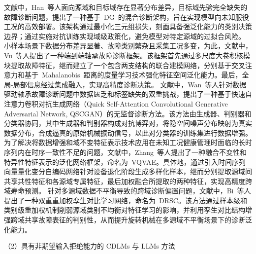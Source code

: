 文献\cite{WOS:000688310200005}中，Han~等人面向源域和目标域存在显著分布差异，目标域先验完全缺失的故障诊断问题，提出了一种基于~DG~的混合诊断架构，旨在实现模型向未知服役工况的高效部署。该架构通过最小化三元组损失，刻画具备强泛化能力的类别决策边界；通过实施对抗训练实现域级政策化，避免模型对特定源域的过拟合风险。
小样本场景下数据分布差异显著、故障类别繁杂且采集工况多变，为此，文献\cite{10478558}中，Vu~等人提出了一种端到端轴承故障诊断框架。该框架首先通过多尺度大卷积核模块提取故障特征，继而建立了一个包含两支结构的联合建模网络，分别基于交叉注意力和基于~Mahalanobis~距离的度量学习技术强化特征空间泛化能力。最后，全局-局部信息经过集成融入，实现高精度诊断决策。
文献\cite{QSCGAN}中，Wan~等人针对数据驱动轴承故障诊断问题中数据匮乏和标签缺失的双重挑战，提出了一种基于快速自注意力卷积对抗生成网络（Quick Self-Attention Convolutional Generative Adversarial Network, QSCGAN）的无监督诊断方法。该方法由生成器、判别器和分类器协同，其中生成器和判别器构成对抗博弈对，将隐空间噪声分布映射为真实数据分布，合成逼真的原始机械振动信号，以此对分类器的训练集进行数据增强。
为了解决将数据增强和域不变特征表示技术应用在未知工况健康管理时面临的长时序列内在时序一致性不足的问题，文献\cite{VQVAE}中，Zhang~等人提出了一种融合不变性和特异性特征表示的泛化网络框架，命名为~VQVAE。具体地，通过引入时间序列向量量化变分自编码网络针对设备退化阶段生成多样化样本，继而分别提取源域间共享共性特征和各源域专属特征，最后加权融合所提取的两种特征，实现高精度跨域寿命预测。
针对多源域数据不平衡导致的跨域诊断偏置问题，文献\cite{10944708}中，Bi~等人提出了一种双重重加权孪生对比学习网络，命名为~DRSC。该方法通过样本级和类别级重加权机制削弱源域类别不均衡对特征学习的影响，并利用孪生对比结构增强跨域共享故障表征的判别性，从而提升旋转机械在多源域不平衡场景下的诊断泛化能力。

（2）{具有非期望输入拒绝能力的 CDLMs 与 LLMs 方法}

